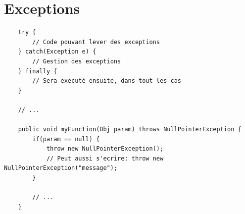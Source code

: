 \documentclass[a4paper, 12pt, french]{article}
\begin{document}
	\section{Exceptions}

	\begin{lstlisting}
	try {
		// Code pouvant lever des exceptions
	} catch(Exception e) {
		// Gestion des exceptions
	} finally {
		// Sera executé ensuite, dans tout les cas
	}

	// ...

	public void myFunction(Obj param) throws NullPointerException {
		if(param == null) {
			throw new NullPointerException();
			// Peut aussi s'ecrire: throw new NullPointerException("message");
		}

		// ...
	}
	\end{lstlisting}
\end{document}
